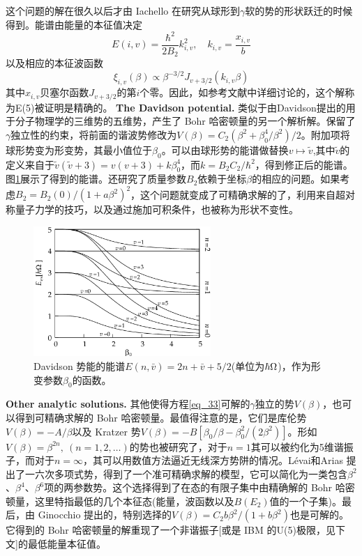这个问题的解在很久以后才由 Iachello 在研究从球形到$\gamma$软的势的形状跃迁的时候得到。能谱由能量的本征值决定
\begin{equation*}
E(i,v)=\frac{\hbar^2}{2B_2}k^2_{i,v},\quad k_{i,v}=\frac{x_{i,v}}{b}
\end{equation*}
以及相应的本征波函数
\begin{equation*}
\xi_{i,v}(\beta)\propto\beta^{-3/2}J_{v+3/2}(k_{i,v}\beta)
\end{equation*}
其中$x_{i,v}$贝塞尔函数$J_{v+3/2}$的第$i$个零。因此，如参考文献中详细讨论的，这个解称为E(5)被证明是精确的。
\vskip 0.6cm
\noindent\textbf{\large The Davidson potential.}
\vskip 0.3cm
类似于由Davidson提出的用于分子物理学的三维势的五维势，产生了 Bohr 哈密顿量的另一个解析解。保留了$\gamma$独立性的约束，将前面的谐波势修改为$V(\beta)=C_2(\beta^2+\beta_0^4/\beta^2)/2$。附加项将球形势变为形变势，其最小值位于$\beta_0$。可以由球形势的能谱做替换$v\mapsto\tilde{v}$,其中$\tilde{v}$的定义来自于$\tilde{v}(\tilde{v}+3)=v(v+3)+k\beta_0^4$，而$k=B_2C_2/\hbar^2$，得到修正后的能谱。图\ref{F_davidson}展示了得到的能谱。还研究了质量参数$B_2$依赖于坐标$\beta$的相应的问题。如果考虑$B_2=B_2(0)/(1+a\beta^2)^2$，这个问题就变成了可精确求解的了，利用来自超对称量子力学的技巧，以及通过施加可积条件，也被称为形状不变性。
\begin{figure}[H]
\centering
\includegraphics[width=0.6\textwidth]{figure/F_davidson.png}
\caption{Davidson 势能的能谱$E(n,\bar{v})=2n+\bar{v}+5/2$(单位为$\hbar{\rm \Omega}$)，作为形变参数$\beta_0$的函数。\label{F_davidson}}
\end{figure}
\vskip 0.6cm
\noindent\textbf{\large Other analytic solutions.}
\vskip 0.3cm
其他使得方程\ref{eq_33}可解的$\gamma$独立的势$V(\beta)$，也可以得到可精确求解的 Bohr 哈密顿量。最值得注意的是，它们是库伦势$V(\beta)=-A/\beta$以及 Kratzer 势$V(\beta)=-B[\beta_0/\beta-\beta_0^2/(2\beta^2)]$。形如$V(\beta)=\beta^{2n},\ (n=1,2,\ldots)$的势也被研究了，对于$n=1$其可以被约化为5维谐振子，而对于$n=\infty$，其可以用数值方法逼近无线深方势阱的情况。L\'{e}vai和Arias 提出了一六次多项式势，得到了一个准可精确求解的模型，它可以简化为一类包含$\beta^2$、$\beta^4$、$\beta^6$项的两参数势。这个选择得到了在态的有限子集中由精确解的 Bohr 哈密顿量，这里特指最低的几个本征态(能量，波函数以及$B(E_2)$值的一个子集)。最后，由 Ginocchio 提出的，特别选择的$V(\beta)=C_2b\beta^2/(1+b\beta^2)$也是可解的。它得到的 Bohr 哈密顿量的解重现了一个非谐振子[或是 IBM 的U(5)极限，见下文]的最低能量本征值。

